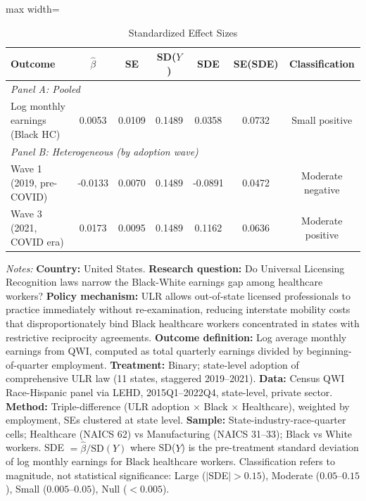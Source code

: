 \begin{table}[t]
\centering
\caption{Standardized Effect Sizes}
\label{tab:sde}
\begin{threeparttable}
\begin{adjustbox}{max width=\textwidth}
\begin{tabular}{lcccccc}
\toprule
Outcome & $\hat{\beta}$ & SE & SD($Y$) & SDE & SE(SDE) & Classification \\
\midrule
\multicolumn{7}{l}{\textit{Panel A: Pooled}} \\
Log monthly earnings (Black HC) & 0.0053 & 0.0109 & 0.1489 & 0.0358 & 0.0732 & Small positive \\
\midrule
\multicolumn{7}{l}{\textit{Panel B: Heterogeneous (by adoption wave)}} \\
Wave 1 (2019, pre-COVID) & -0.0133 & 0.0070 & 0.1489 & -0.0891 & 0.0472 & Moderate negative \\
Wave 3 (2021, COVID era) & 0.0173 & 0.0095 & 0.1489 & 0.1162 & 0.0636 & Moderate positive \\
\bottomrule
\end{tabular}
\end{adjustbox}
\end{threeparttable}
\vspace{0.5em}
\parbox{\textwidth}{\scriptsize\textit{Notes:} \textbf{Country:} United States. \textbf{Research question:} Do Universal Licensing Recognition laws narrow the Black-White earnings gap among healthcare workers? \textbf{Policy mechanism:} ULR allows out-of-state licensed professionals to practice immediately without re-examination, reducing interstate mobility costs that disproportionately bind Black healthcare workers concentrated in states with restrictive reciprocity agreements. \textbf{Outcome definition:} Log average monthly earnings from QWI, computed as total quarterly earnings divided by beginning-of-quarter employment. \textbf{Treatment:} Binary; state-level adoption of comprehensive ULR law (11 states, staggered 2019--2021). \textbf{Data:} Census QWI Race-Hispanic panel via LEHD, 2015Q1--2022Q4, state-level, private sector. \textbf{Method:} Triple-difference (ULR adoption $\times$ Black $\times$ Healthcare), weighted by employment, SEs clustered at state level. \textbf{Sample:} State-industry-race-quarter cells; Healthcare (NAICS 62) vs Manufacturing (NAICS 31--33); Black vs White workers. SDE $= \hat{\beta} / \text{SD}(Y)$ where SD($Y$) is the pre-treatment standard deviation of log monthly earnings for Black healthcare workers. Classification refers to magnitude, not statistical significance: Large ($|$SDE$| > 0.15$), Moderate ($0.05$--$0.15$), Small ($0.005$--$0.05$), Null ($< 0.005$).}
\end{table}

